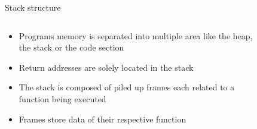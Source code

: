 \documentclass{beamer}
\begin{document}
\begin{frame}[c]{Stack structure}
	\begin{columns}
		\begin{column}{0.55\textwidth}
			\begin{itemize}
				\item Programs memory is separated into multiple area like the heap, the stack or the code section
				\item Return addresses are solely located in the stack
				\item The stack is composed of piled up frames each related to a function being executed
				\item Frames store data of their respective function
			\end{itemize}
		\end{column}
		\begin{column}{0.45\textwidth}
			\begin{figure}
			\centering

\end{figure}
\end{column}
\end{columns}
\end{frame}
\end{document}
